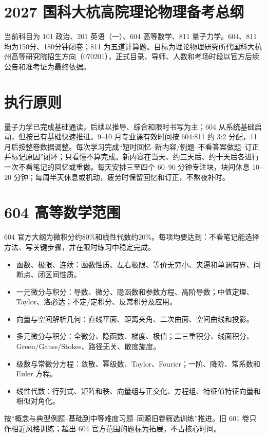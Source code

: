 \documentclass[UTF8,a4paper]{ctexart}
\begin{document}
\section*{2027 国科大杭高院理论物理备考总纲}
当前科目为 101 政治、201 英语（一）、604 高等数学、811 量子力学。604、811 均为150分、180分钟闭卷；811 为五道计算题。目标为理论物理研究所代国科大杭州高等研究院招生方向（070201），正式目录、导师、人数和考场时段以官方后续公告和准考证为最终依据。

\section{执行原则}
量子力学已完成基础通读，后续以推导、综合和限时书写为主；604 从系统基础启动，但按已有基础快速推进。9--10 月专业课有效时间按 604:811 约 3:2 分配，11 月后按整卷数据调整。每次学习完成“短时回忆--新内容/例题--不看答案做题--订正并标记原因”闭环；只看懂不算完成。新内容在当天、约三天后、约十天后各进行一次不看笔记的回忆或重做。每天安排三至四个 60--90 分钟专注块，块间休息 10--20 分钟；每周半天休息或机动，疲劳时保留回忆和订正，不熬夜补时。

\section{604 高等数学范围}
604 官方大纲为微积分约80\%和线性代数约20\%。每项均要达到：不看笔记能选择方法、写关键步骤，并在限时练习中稳定完成。
\begin{itemize}
\item 函数、极限、连续：函数性质、左右极限、等价无穷小、夹逼和单调有界、间断点、闭区间性质。
\item 一元微分与积分：导数、微分、隐函数和参数方程、高阶导数；中值定理、Taylor、洛必达；不定/定积分、反常积分及应用。
\item 向量与空间解析几何：直线平面、距离夹角、二次曲面、空间曲线和投影。
\item 多元微分与积分：全微分、隐函数、梯度、极值；二三重积分、线面积分、Green/Gauss/Stokes、路径无关、散度旋度。
\item 级数与常微分方程：敛散、幂级数、Taylor、Fourier；一阶、降阶、常系数和 Euler 方程。
\item 线性代数：行列式、矩阵和秩、向量组与正交化、方程组、特征值特征向量和相似对角化。
\end{itemize}
按“概念与典型例题--基础到中等难度习题--同源旧卷筛选训练”推进。旧 601 卷只作相近风格训练；超出 604 官方范围的题标为拓展，不占核心时间。
\end{document}
